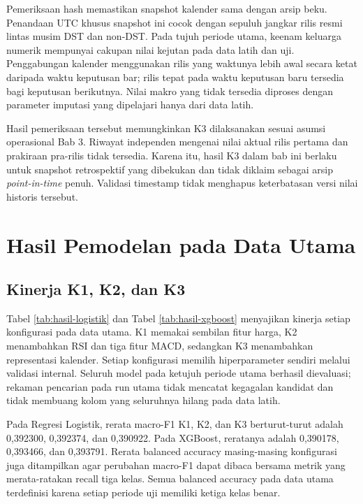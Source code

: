 Pemeriksaan hash memastikan snapshot kalender sama dengan arsip beku. Penandaan UTC khusus snapshot ini cocok dengan sepuluh jangkar rilis resmi lintas musim DST dan non-DST. Pada tujuh periode utama, keenam keluarga numerik mempunyai cakupan nilai kejutan pada data latih dan uji. Penggabungan kalender menggunakan rilis yang waktunya lebih awal secara ketat daripada waktu keputusan bar; rilis tepat pada waktu keputusan baru tersedia bagi keputusan berikutnya. Nilai makro yang tidak tersedia diproses dengan parameter imputasi yang dipelajari hanya dari data latih.

Hasil pemeriksaan tersebut memungkinkan K3 dilaksanakan sesuai asumsi operasional Bab 3. Riwayat independen mengenai nilai aktual rilis pertama dan prakiraan pra-rilis tidak tersedia. Karena itu, hasil K3 dalam bab ini berlaku untuk snapshot retrospektif yang dibekukan dan tidak diklaim sebagai arsip \emph{point-in-time} penuh. Validasi timestamp tidak menghapus keterbatasan versi nilai historis tersebut.

\section{Hasil Pemodelan pada Data Utama}

\subsection{Kinerja K1, K2, dan K3}

Tabel \ref{tab:hasil-logistik} dan Tabel \ref{tab:hasil-xgboost} menyajikan kinerja setiap konfigurasi pada data utama. K1 memakai sembilan fitur harga, K2 menambahkan RSI dan tiga fitur MACD, sedangkan K3 menambahkan representasi kalender. Setiap konfigurasi memilih hiperparameter sendiri melalui validasi internal. Seluruh model pada ketujuh periode utama berhasil dievaluasi; rekaman pencarian pada run utama tidak mencatat kegagalan kandidat dan tidak membuang kolom yang seluruhnya hilang pada data latih.

Pada Regresi Logistik, rerata macro-F1 K1, K2, dan K3 berturut-turut adalah 0,392300, 0,392374, dan 0,390922. Pada XGBoost, reratanya adalah 0,390178, 0,393466, dan 0,393791. Rerata balanced accuracy masing-masing konfigurasi juga ditampilkan agar perubahan macro-F1 dapat dibaca bersama metrik yang merata-ratakan recall tiga kelas. Semua balanced accuracy pada data utama terdefinisi karena setiap periode uji memiliki ketiga kelas benar.


